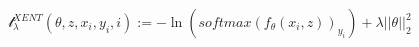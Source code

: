 \documentclass[preview]{standalone}
\begin{document}
\begin{align*}
\mathcal{l}_{\lambda}^{XENT}(\theta, z, x_i, y_i, i) := -\ln(softmax(f_{\theta}(x_i, z))_{y_i}) + \lambda ||\theta||_{2}^2
\end{align*}
\end{document}
